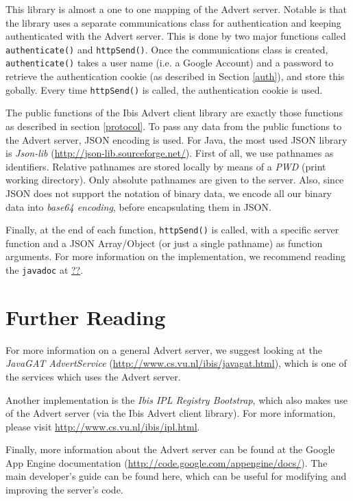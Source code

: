\documentclass[a4paper,10pt]{article}
\begin{document}
This library is almost a one to one mapping of the Advert server. Notable is
that the library uses a separate communications class for authentication and
keeping authenticated with the Advert server. This is done by two major
functions called \texttt{authenticate()} and \texttt{httpSend()}. Once the
communications class is created,  \texttt{authenticate()} takes a user name
(i.e. a Google Account) and a password to retrieve the authentication cookie
(as described in Section \ref{auth}), and store this gobally. Every time
\texttt{httpSend()} is called, the authentication cookie is used.

The public functions of the Ibis Advert client library are exactly those
functions as described in section \ref{protocol}. To pass any data from the public functions
to the Advert server, JSON encoding is used. For Java, the most used JSON
library is \emph{Json-lib} (\url{http://json-lib.sourceforge.net/}). First
of all, we use pathnames as identifiers. Relative pathnames are stored
locally by means of a \emph{PWD} (print working directory). Only absolute
pathnames are given to the server. Also, since JSON does not support the
notation of binary data, we encode all our binary data into \emph{base64
encoding}, before encapsulating them in JSON. 

Finally, at the end of each function, \texttt{httpSend()} is called, with a
specific server function and a JSON Array/Object (or just a single pathname) as
function arguments. For more information on the implementation, we recommend
reading the \texttt{javadoc} at \url{??}. %
 
\section{Further Reading}
\label{further}
For more information on a general Advert server, we suggest looking at the
\emph{JavaGAT AdvertService} (\url{http://www.cs.vu.nl/ibis/javagat.html}),
which is one of the services which uses the Advert server.

Another implementation is the \emph{Ibis IPL Registry Bootstrap}, which also
makes use of the Advert server (via the Ibis Advert client library). For more
information, please visit \url{http://www.cs.vu.nl/ibis/ipl.html}.

Finally, more information about the Advert server can be found at the Google
App Engine documentation (\url{http://code.google.com/appengine/docs/}). The
main developer's guide can be found here, which can be useful for modifying and
improving the server's code.
\end{document}
